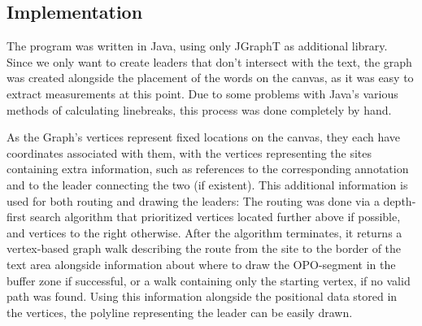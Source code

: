 \documentclass[11pt,a4paper]{article}
\begin{document}
\subsection{Implementation}
The program was written in Java, using only JGraphT\cite{JGraphT} as additional library. Since we only want to create leaders that don't intersect with the text, the graph was created alongside the placement of the words on the canvas, as it was easy to extract measurements at this point. Due to some problems with Java's various methods of calculating linebreaks, this process was done completely by hand.

As the Graph's vertices represent fixed locations on the canvas, they each have coordinates associated with them, with the vertices representing the sites containing extra information, such as references to the corresponding annotation and to the leader connecting the two (if existent). This additional information is used for both routing and drawing the leaders: The routing was done via a depth-first search algorithm that prioritized vertices located further above if possible, and vertices to the right otherwise. After the algorithm terminates, it returns  a vertex-based graph walk describing the route from the site to the border of the text area alongside information about where to draw the OPO-segment in the buffer zone if successful, or a walk containing only the starting vertex, if no valid path was found. Using this information alongside the positional data stored in the vertices, the polyline representing the leader can be easily drawn.











\end{document}
